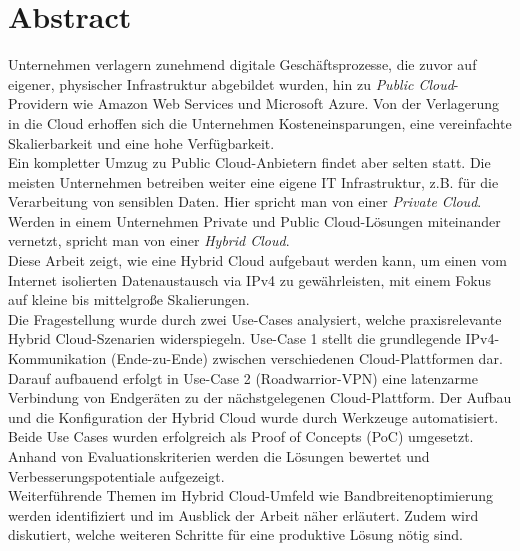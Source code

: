 \chapter{Abstract}

Unternehmen verlagern zunehmend digitale Geschäftsprozesse, die zuvor auf eigener, physischer Infrastruktur abgebildet wurden, hin zu \textit{Public Cloud}-Providern wie Amazon Web Services und Microsoft Azure. Von der Verlagerung in die Cloud erhoffen sich die Unternehmen Kosteneinsparungen, eine vereinfachte Skalierbarkeit und eine hohe Verfügbarkeit.\\
Ein kompletter Umzug zu Public Cloud-Anbietern findet aber selten statt. Die meisten Unternehmen betreiben weiter eine eigene IT Infrastruktur, z.B. für die Verarbeitung von sensiblen Daten. 
Hier spricht man von einer \textit{Private Cloud}. Werden in einem Unternehmen Private und Public Cloud-Lösungen miteinander vernetzt, spricht man von einer \textit{Hybrid Cloud}. \\
Diese Arbeit zeigt, wie eine Hybrid Cloud aufgebaut werden kann, um einen vom Internet isolierten Datenaustausch via IPv4 zu gewährleisten, mit einem Fokus auf kleine bis mittelgroße Skalierungen.\\
Die Fragestellung wurde durch zwei Use-Cases analysiert, welche praxisrelevante Hybrid Cloud-Szenarien widerspiegeln. Use-Case 1 stellt die grundlegende IPv4-Kommunikation (\glqq Ende-zu-Ende\grqq{}) zwischen verschiedenen Cloud-Plattformen dar. Darauf aufbauend erfolgt in Use-Case 2 (\glqq Roadwarrior-VPN\grqq{}) eine latenzarme Verbindung von Endgeräten zu der nächstgelegenen Cloud-Plattform. Der Aufbau und die Konfiguration der Hybrid Cloud wurde durch Werkzeuge automatisiert.\\
Beide Use Cases wurden erfolgreich als Proof of Concepts (PoC) umgesetzt. Anhand von Evaluationskriterien werden die Lösungen bewertet und Verbesserungspotentiale aufgezeigt.\\
Weiterführende Themen im Hybrid Cloud-Umfeld wie Bandbreitenoptimierung werden identifiziert und im Ausblick der Arbeit näher erläutert. Zudem wird diskutiert, welche weiteren Schritte für eine produktive Lösung nötig sind.\\